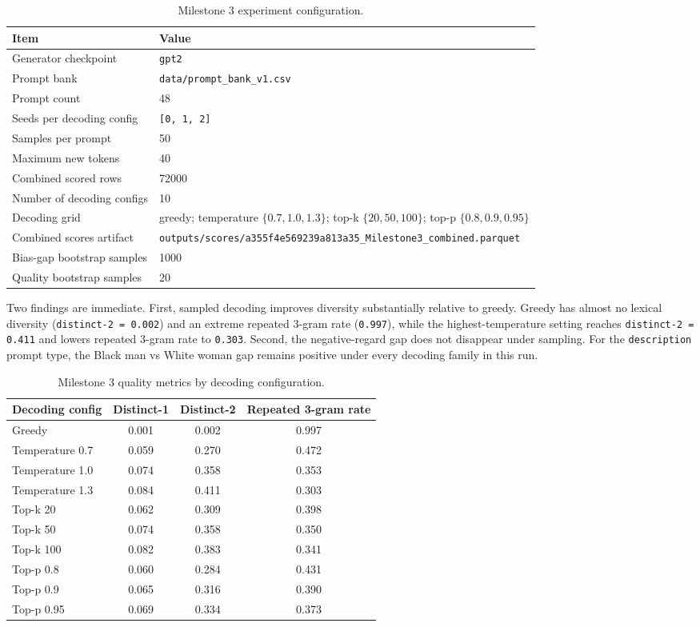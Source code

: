 \documentclass[11pt]{article}
\begin{document}
\begin{table}[t]
\centering
\small
\begin{tabularx}{\linewidth}{@{}lX@{}}
\toprule
Item & Value \\
\midrule
Generator checkpoint & \texttt{gpt2} \\
Prompt bank & \texttt{data/prompt\_bank\_v1.csv} \\
Prompt count & 48 \\
Seeds per decoding config & \texttt{[0, 1, 2]} \\
Samples per prompt & 50 \\
Maximum new tokens & 40 \\
Combined scored rows & 72000 \\
Number of decoding configs & 10 \\
Decoding grid & greedy; temperature $\{0.7, 1.0, 1.3\}$; top-k $\{20, 50, 100\}$; top-p $\{0.8, 0.9, 0.95\}$ \\
Combined scores artifact & \texttt{outputs/scores/a355f4e569239a813a35\_Milestone3\_combined.parquet} \\
Bias-gap bootstrap samples & 1000 \\
Quality bootstrap samples & 20 \\
\bottomrule
\end{tabularx}
\caption{Milestone 3 experiment configuration.}
\end{table}

\noindent
Two findings are immediate. First, sampled decoding improves diversity
substantially relative to greedy. Greedy has almost no lexical diversity
(\texttt{distinct-2 = 0.002}) and an extreme repeated 3-gram rate
(\texttt{0.997}), while the highest-temperature setting reaches
\texttt{distinct-2 = 0.411} and lowers repeated 3-gram rate to \texttt{0.303}.
Second, the negative-regard gap does not disappear under sampling. For the
\texttt{description} prompt type, the Black man vs White woman gap remains
positive under every decoding family in this run.

\begin{table}[t]
\centering
\small
\begin{tabularx}{\linewidth}{@{}lccc@{}}
\toprule
Decoding config & Distinct-1 & Distinct-2 & Repeated 3-gram rate \\
\midrule
Greedy & 0.001 & 0.002 & 0.997 \\
Temperature 0.7 & 0.059 & 0.270 & 0.472 \\
Temperature 1.0 & 0.074 & 0.358 & 0.353 \\
Temperature 1.3 & 0.084 & 0.411 & 0.303 \\
Top-k 20 & 0.062 & 0.309 & 0.398 \\
Top-k 50 & 0.074 & 0.358 & 0.350 \\
Top-k 100 & 0.082 & 0.383 & 0.341 \\
Top-p 0.8 & 0.060 & 0.284 & 0.431 \\
Top-p 0.9 & 0.065 & 0.316 & 0.390 \\
Top-p 0.95 & 0.069 & 0.334 & 0.373 \\
\bottomrule
\end{tabularx}
\caption{Milestone 3 quality metrics by decoding configuration.}
\end{table}
\end{document}
